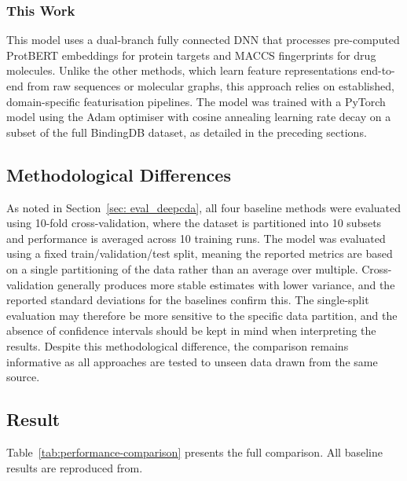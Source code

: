 \subsubsection{This Work}
This model uses a dual-branch fully connected DNN that processes pre-computed ProtBERT embeddings for protein targets and MACCS fingerprints for drug molecules.
Unlike the other methods, which learn feature representations end-to-end from raw sequences or molecular graphs, this approach relies on established, domain-specific featurisation pipelines.
The model was trained with a PyTorch model using the Adam optimiser with cosine annealing learning rate decay on a subset of the full BindingDB dataset, as detailed in the preceding sections.

\subsection{Methodological Differences}
\label{subsec:methodological-differences}
As noted in Section~\ref{sec: eval_deepcda}, all four baseline methods were evaluated using 10-fold cross-validation, where the dataset is partitioned into 10 subsets and performance is averaged across 10 training runs.
The model was evaluated using a fixed train/validation/test split, meaning the reported metrics are based on a single partitioning of the data rather than an average over multiple.
Cross-validation generally produces more stable estimates with lower variance, and the reported standard deviations for the baselines confirm this.
The single-split evaluation may therefore be more sensitive to the specific data partition, and the absence of confidence intervals should be kept in mind when interpreting the results.
Despite this methodological difference, the comparison remains informative as all approaches are tested to unseen data drawn from the same source.

\subsection{Result}
Table~\ref{tab:performance-comparison} presents the full comparison.
All baseline results are reproduced from\citet{Yang2024}.

